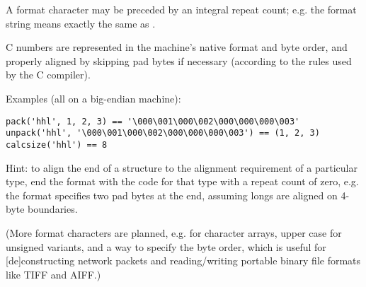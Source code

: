 A format character may be preceded by an integral repeat count; e.g.
the format string  means exactly the same as .

C numbers are represented in the machine's native format and byte
order, and properly aligned by skipping pad bytes if necessary
(according to the rules used by the C compiler).

Examples (all on a big-endian machine):

\bcode\begin{verbatim}
pack('hhl', 1, 2, 3) == '\000\001\000\002\000\000\000\003'
unpack('hhl', '\000\001\000\002\000\000\000\003') == (1, 2, 3)
calcsize('hhl') == 8
\end{verbatim}\ecode

Hint: to align the end of a structure to the alignment requirement of
a particular type, end the format with the code for that type with a
repeat count of zero, e.g. the format  specifies two
pad bytes at the end, assuming longs are aligned on 4-byte boundaries.

(More format characters are planned, e.g.  for character
arrays, upper case for unsigned variants, and a way to specify the
byte order, which is useful for [de]constructing network packets and
reading/writing portable binary file formats like TIFF and AIFF.)
